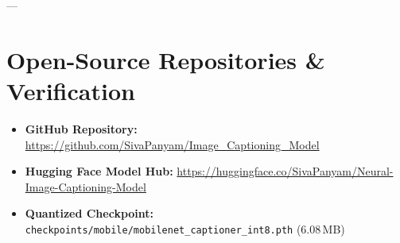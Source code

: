\documentclass[11pt,a4paper]{article}
\begin{document}
---

\section{Open-Source Repositories \& Verification}
\begin{itemize}
    \item \textbf{GitHub Repository:} \url{https://github.com/SivaPanyam/Image_Captioning_Model}
    \item \textbf{Hugging Face Model Hub:} \url{https://huggingface.co/SivaPanyam/Neural-Image-Captioning-Model}
    \item \textbf{Quantized Checkpoint:} \texttt{checkpoints/mobile/mobilenet\_captioner\_int8.pth} (6.08\,MB)
\end{itemize}
\end{document}
